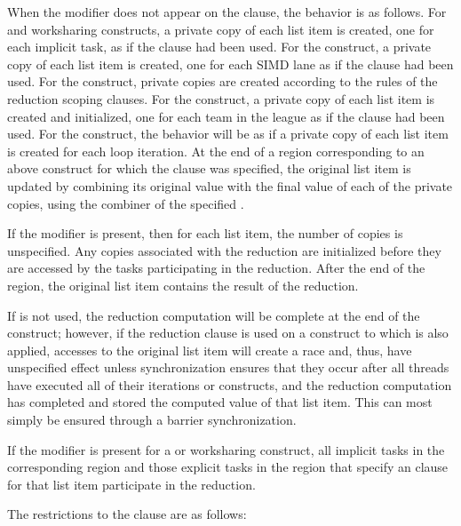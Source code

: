 When the  modifier does not appear on the clause, the behavior is
as follows. For  and worksharing constructs, a private copy of
each list item is created, one for each implicit task, as if the
 clause had been used. For the  construct, a private
copy of each list item is created, one for each SIMD lane as if the
 clause had been used.  For the  construct,
private copies are created according to the rules of the reduction scoping
clauses.  For the  construct, a private copy of each list item is
created and initialized, one for each team in the league as if the
 clause had been used. For the  construct, the
behavior will be as if a private copy of each list item is created for each
loop iteration.  At the end of a region corresponding to an above construct
for which the  clause was specified, the original list item is
updated by combining its original value with the final value of each of the
private copies, using the combiner of the specified
. 

If the  modifier is present, then for each list item, the number of
copies is unspecified. Any copies associated with the reduction are
initialized before they are accessed by the tasks participating in the
reduction. After the end of the region, the original list item contains the
result of the reduction.

If  is not used, the reduction computation will be complete at the end of the
construct; however, if the reduction clause is used on a construct to which  is
also applied, accesses to the original list item will create a race and, thus, have
unspecified effect unless synchronization ensures that they occur after all threads have
executed all of their iterations or  constructs, and the reduction computation
has completed and stored the computed value of that list item. This can most simply be
ensured through a barrier synchronization.

If the  modifier is present for a  or worksharing
construct, all implicit tasks in the corresponding region and those explicit tasks in the
region that specify an  clause for that list item
participate in the reduction.

\restrictions
The restrictions to the  clause are as follows:

